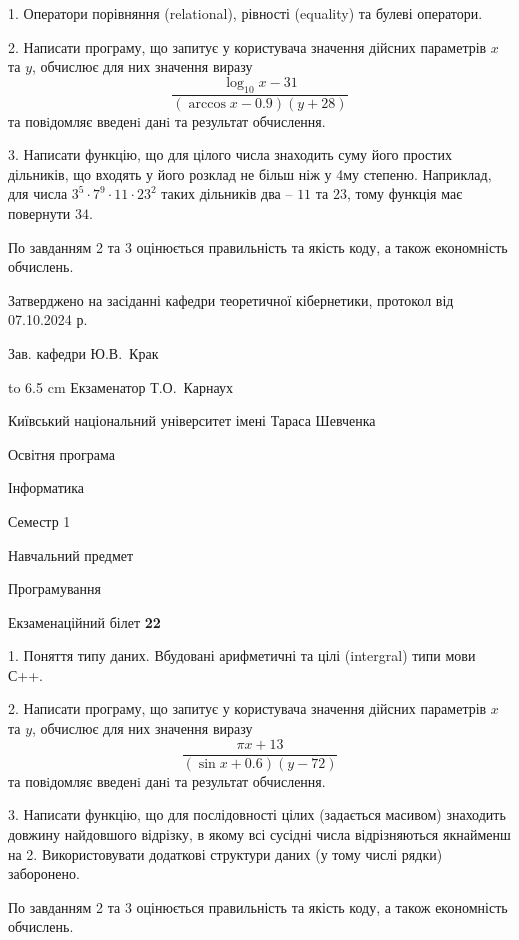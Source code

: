 \documentclass[12pt, ukrainian]{article}
\begin{document}
{%
1. Оператори порівняння (relational), рівності (equality) та булеві оператори.%
\par
2. Написати програму, що запитує у користувача значення дійсних параметрів $x$ та $y$, обчислює для них значення виразу 
$$\frac{\log_{10} x - 31}{(\arccos x - 0.9) (y + 28)}$$ 
та повiдомляє введенi данi та результат обчислення.

\par
3. Написати функцію, що для цілого числа знаходить суму його простих дільників, що входять у його розклад не більш ніж у 4му степеню. Наприклад, для числа $3^5{\cdot}7^9{\cdot}11{\cdot}23^{2}$ таких дільників два – $11$ та $23$, тому функція має повернути $34$.

По завданням 2 та 3 оцінюється правильність та якість коду, а також економність обчислень.

}
{\smallskip\smallskip \begin {scriptsize} Затверджено на засіданні кафедри теоретичної кібернетики, протокол   від   07.10.2024 р.\par\smallskip\smallskip\smallskip\smallskip
{\parbox {6.5 cm} {Зав. кафедри \dotfill Ю.В.~Крак}}\hspace {0.7cm} {\hbox to 6.5 cm { Екзаменатор \dotfill Т.О.~Карнаух}} \end{scriptsize}}
\newpage
{{\begin {scriptsize}\par
{ \center  Київський національний університет імені Тараса Шевченка \par}
{\parbox {5 cm}{Освітня програма \hfill}{\parbox {7 cm}{Інформатика\hfill}}\parbox {6 cm}{\hfill Семестр 1}}\par
{\parbox {5 cm} {Навчальний предмет \hfill}\parbox {7 cm}{Програмування \hfill}\parbox {6cm}{\hfill}\par}\vspace{-15pt} \end{scriptsize}}{\center Екзаменаційний білет \No \textbf { 22 }\par}}
{%
1. Поняття типу даних. Вбудовані арифметичні та цілі (intergral) типи мови С++.%
\par
2. Написати програму, що запитує у користувача значення дійсних параметрів $x$ та $y$, обчислює для них значення виразу 
$$\frac{\pi x + 13}{(\sin x + 0.6) (y - 72)}$$ 
та повiдомляє введенi данi та результат обчислення.

\par
3. Написати функцію, що для послідовності цілих (задається масивом) знаходить довжину найдовшого відрізку, в якому всі сусідні числа відрізняються якнайменш на 2. Використовувати додаткові структури даних (у тому числі рядки) заборонено.

По завданням 2 та 3 оцінюється правильність та якість коду, а також економність обчислень.

}
\end{document}
